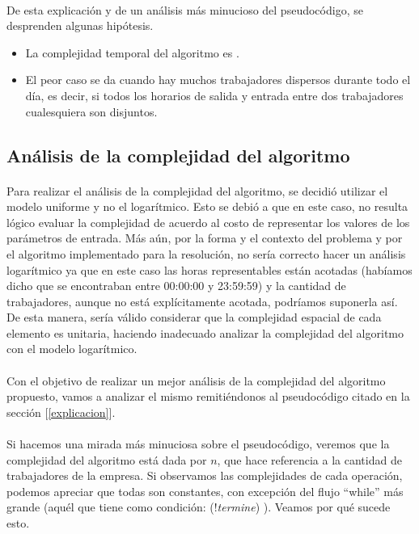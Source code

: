 \paragraph{}
De esta explicación y de un análisis más minucioso del pseudocódigo, se desprenden algunas hipótesis.
\begin{itemize}
	\item La complejidad temporal del algoritmo es .
	\item El peor caso se da cuando hay muchos trabajadores dispersos durante todo el día, es decir, si todos los horarios de salida y entrada entre dos trabajadores cualesquiera son disjuntos.
\end{itemize}


\subsection{Análisis de la complejidad del algoritmo}

\paragraph{}
Para realizar el análisis de la complejidad del algoritmo, se decidió utilizar el modelo uniforme y no el logarítmico. Esto se debió a que en este caso, no resulta lógico evaluar la complejidad de acuerdo al costo de representar los valores de los parámetros de entrada. Más aún, por la forma y el contexto del problema y por el algoritmo implementado para la resolución, no sería correcto hacer un análisis logarítmico ya que en este caso las horas representables están acotadas (habíamos dicho que se encontraban entre 00:00:00 y 23:59:59) y la cantidad de trabajadores, aunque no está explícitamente acotada, podríamos suponerla así. De esta manera, sería válido considerar que la complejidad espacial de cada elemento es unitaria, haciendo inadecuado analizar la complejidad del algoritmo con el modelo logarítmico.

\paragraph{}
Con el objetivo de realizar un mejor análisis de la complejidad del algoritmo propuesto, vamos a analizar el mismo remitiéndonos al pseudocódigo citado en la sección [\ref{explicacion}].

\paragraph{}
Si hacemos una mirada más minuciosa sobre el pseudocódigo, veremos que la complejidad del algoritmo está dada por $n$, que hace referencia a la cantidad de trabajadores de la empresa. Si observamos las complejidades de cada operación, podemos apreciar que todas son constantes, con excepción del flujo ``while'' más grande (aquél que tiene como condición: (!\textit{termine}) ). Veamos por qué sucede esto.

